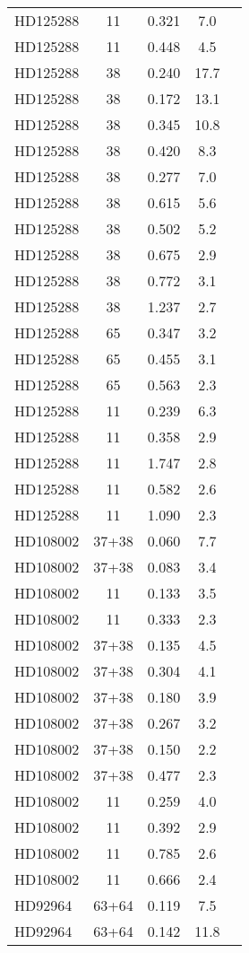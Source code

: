 \begin{table*}
\begin{tabular}{l c c c c}
HD125288 & 11 & 0.321 & 7.0\\ 
HD125288 & 11 & 0.448 & 4.5\\ 
HD125288 & 38 & 0.240 & 17.7\\ 
HD125288 & 38 & 0.172 & 13.1\\ 
HD125288 & 38 & 0.345 & 10.8\\ 
HD125288 & 38 & 0.420 & 8.3\\ 
HD125288 & 38 & 0.277 & 7.0\\ 
HD125288 & 38 & 0.615 & 5.6\\ 
HD125288 & 38 & 0.502 & 5.2\\ 
HD125288 & 38 & 0.675 & 2.9\\ 
HD125288 & 38 & 0.772 & 3.1\\ 
HD125288 & 38 & 1.237 & 2.7\\ 
HD125288 & 65 & 0.347 & 3.2\\ 
HD125288 & 65 & 0.455 & 3.1\\ 
HD125288 & 65 & 0.563 & 2.3\\ 
HD125288 & 11 & 0.239 & 6.3\\ 
HD125288 & 11 & 0.358 & 2.9\\ 
HD125288 & 11 & 1.747 & 2.8\\ 
HD125288 & 11 & 0.582 & 2.6\\ 
HD125288 & 11 & 1.090 & 2.3\\ 
\hline
HD108002 & 37+38 & 0.060 & 7.7\\ 
HD108002 & 37+38 & 0.083 & 3.4\\ 
HD108002 & 11 & 0.133 & 3.5\\ 
HD108002 & 11 & 0.333 & 2.3\\ 
HD108002 & 37+38 & 0.135 & 4.5\\ 
HD108002 & 37+38 & 0.304 & 4.1\\ 
HD108002 & 37+38 & 0.180 & 3.9\\ 
HD108002 & 37+38 & 0.267 & 3.2\\ 
HD108002 & 37+38 & 0.150 & 2.2\\ 
HD108002 & 37+38 & 0.477 & 2.3\\ 
HD108002 & 11 & 0.259 & 4.0\\ 
HD108002 & 11 & 0.392 & 2.9\\ 
HD108002 & 11 & 0.785 & 2.6\\ 
HD108002 & 11 & 0.666 & 2.4\\ 
\hline
HD92964 & 63+64 & 0.119 & 7.5\\ 
HD92964 & 63+64 & 0.142 & 11.8\\ 

\end{tabular}
\end{table*}
